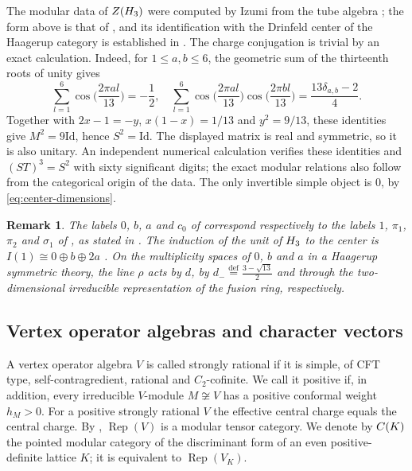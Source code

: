\documentclass[leqno]{article}
\let\cal\relax
\newcommand{\cal}{\mathcal}
\newcommand{\Id}{\mathrm{Id}}
\renewcommand{\leq}{\ensuremath{\leqslant}}
\newcommand{\ov}{\overset}
\DeclareMathOperator{\Rep}{Rep}
\newtheorem{remark}[thm]{Remark}
\numberwithin{equation}{section}
\begin{document}
The modular data of $Z(\cal H_3)$ were computed by Izumi from the tube algebra \cite{Izu01}; the form above is that of \cite{EvG11}, and its identification with the Drinfeld center of the Haagerup category is established in \cite{GSY26}. The charge conjugation is trivial by an exact calculation. Indeed, for $1 \leq a,b \leq 6$, the geometric sum of the thirteenth roots of unity gives
\[
\sum_{l = 1}^6 \cos\Big(\frac{2\pi al}{13}\Big) = -\frac12,\quad
\sum_{l = 1}^6 \cos\Big(\frac{2\pi al}{13}\Big)\cos\Big(\frac{2\pi bl}{13}\Big)
= \frac{13\delta_{a,b}-2}{4}.
\]
Together with $2x-1 = -y$, $x(1-x) = 1/13$ and $y^2 = 9/13$, these identities give $M^2 = 9\Id$, hence $S^2 = \Id$. The displayed matrix is real and symmetric, so it is also unitary. An independent numerical calculation verifies these identities and $(ST)^3 = S^2$ with sixty significant digits; the exact modular relations also follow from the categorical origin of the data. The only invertible simple object is $0$, by \eqref{eq:center-dimensions}.

\begin{remark}\normalfont
\label{rem:labels}
The labels $0$, $b$, $a$ and $c_0$ of \cite{EvG11} correspond respectively to the labels $1$, $\pi_1$, $\pi_2$ and $\sigma_1$ of \cite{AHKZ26,BoS25}, as stated in \cite[p.~2]{Hua26}. The induction of the unit of $\cal H_3$ to the center is $I(1) \cong 0 \oplus b \oplus 2a$ \cite[Section 2.2]{EvG11}. On the multiplicity spaces of $0$, $b$ and $a$ in a Haagerup symmetric theory, the line $\rho$ acts by $d$, by $d_- \ov{\mathrm{def}}{=} \frac{3-\sqrt{13}}{2}$ and through the two-dimensional irreducible representation of the fusion ring, respectively.
\end{remark}

\subsection{Vertex operator algebras and character vectors}

A vertex operator algebra $V$ is called strongly rational if it is simple, of CFT type, self-contragredient, rational and $C_2$-cofinite. We call it positive if, in addition, every irreducible $V$-module $M \not\cong V$ has a positive conformal weight $h_M > 0$. For a positive strongly rational $V$ the effective central charge equals the central charge. By \cite{Hua08}, $\Rep(V)$ is a modular tensor category. We denote by $\cal C(K)$ the pointed modular category of the discriminant form of an even positive-definite lattice $K$; it is equivalent to $\Rep(V_K)$.
\end{document}
